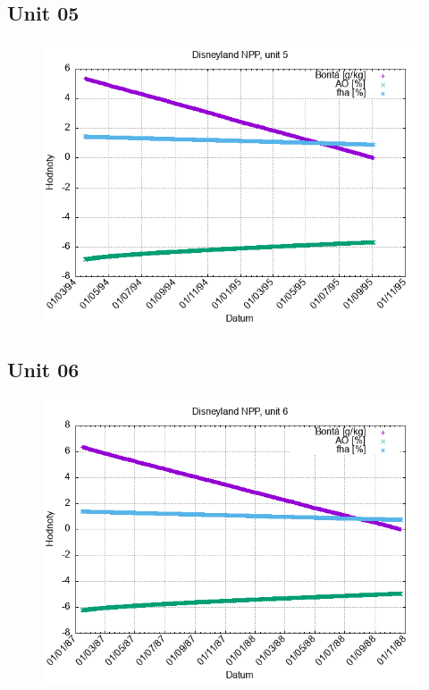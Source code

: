 \documentclass{article}
\begin{document}
\subsection*{Unit 05}
\begin{figure}[h!]
\centering
\includegraphics[width=14cm]{./grafy/Disneyland05.png}
\end{figure}
\clearpage
\subsection*{Unit 06}
\begin{figure}[h!]
\centering
\includegraphics[width=14cm]{./grafy/Disneyland06.png}
\end{figure}
\clearpage
\end{document}
